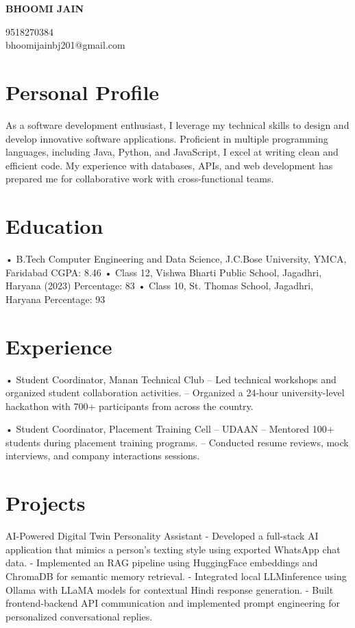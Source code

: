 \documentclass[11pt,a4paper]{article}
\begin{document}
{\Huge \textbf{BHOOMI JAIN}}

\vspace{0.2em}

9518270384 \\
bhoomijainbj201@gmail.com

\section*{Personal Profile}

As a software development enthusiast, I leverage my technical skills to design and develop innovative software applications. Proficient in multiple programming languages, including Java, Python, and JavaScript, I excel at writing clean and efficient code. My experience with databases, APIs, and web development has prepared me for collaborative work with cross-functional teams.



\section*{Education}

• B.Tech Computer Engineering and Data Science, J.C.Bose University, YMCA, Faridabad CGPA: 8.46
• Class 12, Vishwa Bharti Public School, Jagadhri, Haryana (2023) Percentage: 83%
• Class 10, St. Thomas School, Jagadhri, Haryana Percentage: 93%



\section*{Experience}

• Student Coordinator, Manan Technical Club
– Led technical workshops and organized student collaboration activities.
– Organized a 24-hour university-level hackathon with 700+ participants from across the country.

• Student Coordinator, Placement Training Cell – UDAAN
– Mentored 100+ students during placement training programs.
– Conducted resume reviews, mock interviews, and company interactions sessions.



\section*{Projects}

AI-Powered Digital Twin Personality Assistant
- Developed a full-stack AI application that mimics a person's texting style using exported WhatsApp chat data.
- Implemented an RAG pipeline using HuggingFace embeddings and ChromaDB for semantic memory retrieval.
- Integrated local LLMinference using Ollama with LLaMA models for contextual Hindi response generation.
- Built frontend-backend API communication and implemented prompt engineering for personalized conversational replies.
\end{document}
